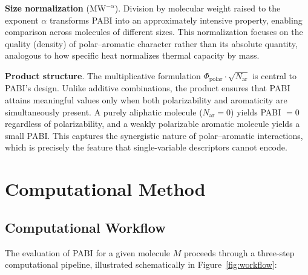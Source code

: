 \documentclass[12pt,a4paper]{article}
\begin{document}
\textbf{Size normalization} ($\text{MW}^{-\alpha}$). Division by molecular weight raised to the exponent $\alpha$ transforms PABI into an approximately intensive property, enabling comparison across molecules of different sizes. This normalization focuses on the quality (density) of polar--aromatic character rather than its absolute quantity, analogous to how specific heat normalizes thermal capacity by mass\cite{atkins2014physical}.

\textbf{Product structure}. The multiplicative formulation $\Phi_{\text{polar}} \cdot \sqrt{N_{\text{ar}}}$ is central to PABI's design. Unlike additive combinations, the product ensures that PABI attains meaningful values only when both polarizability and aromaticity are simultaneously present. A purely aliphatic molecule ($N_{\text{ar}} = 0$) yields PABI $= 0$ regardless of polarizability, and a weakly polarizable aromatic molecule yields a small PABI. This captures the synergistic nature of polar--aromatic interactions, which is precisely the feature that single-variable descriptors cannot encode.

\section{Computational Method}
\label{sec:computational}

\subsection{Computational Workflow}

The evaluation of PABI for a given molecule $M$ proceeds through a three-step computational pipeline, illustrated schematically in Figure~\ref{fig:workflow}:
\end{document}
